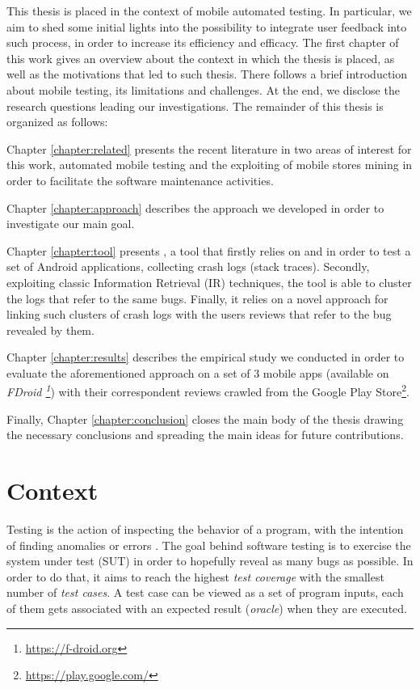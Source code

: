 \label{chapter:intro}
This thesis is placed in the context of mobile automated testing. In particular, we aim to shed some initial lights into the possibility to integrate user feedback into such process, in order to increase its efficiency and efficacy.
The first chapter of this work gives an overview about the context in which the thesis is placed, as well as the motivations that led to such thesis. There follows a brief introduction about mobile testing, its limitations and challenges. At the end, we disclose the research questions leading our investigations. 
The remainder of this thesis is organized as follows: 

Chapter \ref{chapter:related} presents the recent literature in two areas of interest for this work, \ie automated mobile testing and the exploiting of mobile stores mining in order to facilitate the software maintenance activities.

Chapter \ref{chapter:approach} describes the approach we developed in order to investigate our main goal.

Chapter \ref{chapter:tool} presents \toolname, a tool that firstly relies on \monkey and \sapienz in order to test a set of Android applications, collecting crash logs (\ie stack traces). Secondly, exploiting classic Information Retrieval (IR) techniques, the tool is able to cluster the logs that refer to the same bugs. Finally, it relies on a novel approach for linking such clusters of crash logs with the users reviews that refer to the bug revealed by them. 

Chapter \ref{chapter:results} describes the empirical study we conducted in order to evaluate the aforementioned approach on a set of 3 mobile apps (available on \textit{FDroid \footnote{\url{https://f-droid.org}}}) with their correspondent reviews crawled from the Google Play Store\footnote{\url{https://play.google.com/}}. 

Finally, Chapter \ref{chapter:conclusion} closes the main body of the thesis drawing the necessary conclusions and spreading the main ideas for future contributions.


\section{Context}
Testing is the action of inspecting the behavior of a program, with the intention of finding anomalies or errors \cite{testing}.
The goal behind software testing is to exercise the system under test (SUT) in order to hopefully reveal as many bugs as possible. In order to do that, it aims to reach the highest \textit{test coverage} with the smallest number of \textit{test cases}. A test case can be viewed as a set of program inputs, each of them gets associated with an expected result (\ie \textit{oracle}) when they are executed. 

